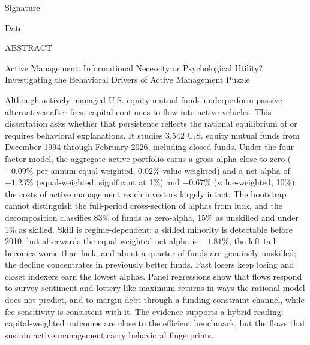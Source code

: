 \documentclass[12pt, oneside]{report}
\begin{document}
\vspace{1in}

\noindent Signature \dotfill

\vspace{0.3in}

\noindent Date \dotfill

\clearpage

\thispagestyle{plain}
\begin{center}
ABSTRACT

Active Management: Informational Necessity or Psychological Utility?\\
Investigating the Behavioral Drivers of Active Management Puzzle

\vspace{12pt}
\end{center}

\noindent Although actively managed U.S. equity mutual funds underperform passive alternatives after fees, capital continues to flow into active vehicles. This dissertation asks whether that persistence reflects the rational equilibrium of \textcite{BerkGreen2004} or requires behavioral explanations. It studies 3,542 U.S. equity mutual funds from December 1994 through February 2026, including closed funds. Under the \textcite{Carhart1997} four-factor model, the aggregate active portfolio earns a gross alpha close to zero ($-0.09$\% per annum equal-weighted, 0.02\% value-weighted) and a net alpha of $-1.23$\% (equal-weighted, significant at 1\%) and $-0.67$\% (value-weighted, 10\%): the costs of active management reach investors largely intact. The \textcite{FamaFrench2010} bootstrap cannot distinguish the full-period cross-section of alphas from luck, and the \textcite{BarrasScailletWermers2010} decomposition classifies 83\% of funds as zero-alpha, 15\% as unskilled and under 1\% as skilled. Skill is regime-dependent: a skilled minority is detectable before 2010, but afterwards the equal-weighted net alpha is $-1.81$\%, the left tail becomes worse than luck, and about a quarter of funds are genuinely unskilled; the decline concentrates in previously better funds. Past losers keep losing and closet indexers earn the lowest alphas. Panel regressions show that flows respond to survey sentiment and lottery-like maximum returns in ways the rational model does not predict, and to margin debt through a funding-constraint channel, while fee sensitivity is consistent with it. The evidence supports a hybrid reading: capital-weighted outcomes are close to the efficient benchmark, but the flows that sustain active management carry behavioral fingerprints.
\end{document}
